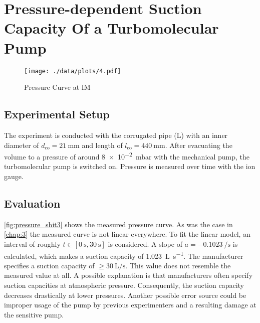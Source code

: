 \chapter{Pressure-dependent Suction Capacity Of a Turbomolecular Pump}
\begin{figure}[hbp]
	\centering
	\texttt{[image: ./data/plots/4.pdf]}
	\caption[Pressure Over Time]{Pressure Curve at IM}
	\label{fig:pressure_shit3}
\end{figure}

\section{Experimental Setup}
The experiment is conducted with the corrugated pipe (L) with an inner diameter of $d_\text{co}=\SI{21}{\milli\meter}$ and length of $l_\text{co}=\SI{440}{\milli\meter}$.
After evacuating the volume to a pressure of around \SI{8e-2}{\milli\bar} with the mechanical pump, the turbomolecular pump is switched on.
Pressure is measured over time with the ion gauge.

\section{Evaluation}
\autoref{fig:pressure_shit3} shows the measured pressure curve.
As was the case in \autoref{chap:3} the measured curve is not linear everywhere.
To fit the linear model, an interval of roughly $t\in[\SI{0}{\second},\SI{30}{\second}]$ is considered.
A slope of $a=\SI{-0.1023}{\per\second}$ is calculated, which makes a suction capacity of \SI{1.023}{\liter\per\second}.
The manufacturer specifies a suction capacity of $\geq\SI{30}{\liter\per\second}$.
This value does not resemble the measured value at all.
A possible explanation is that manufacturers often specify suction capacities at atmospheric pressure.
Consequently, the suction capacity decreases drastically at lower pressures.
Another possible error source could be improper usage of the pump by previous experimenters and a resulting damage at the sensitive pump.
